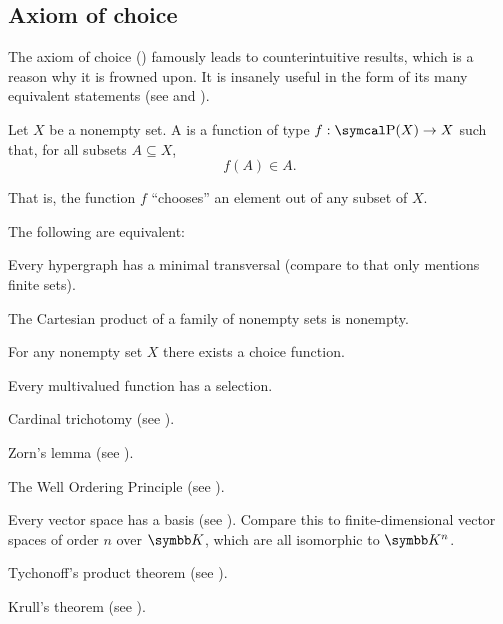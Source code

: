 \subsection{Axiom of choice}\label{subsec:axiom_of_choice}

\begin{remark}\label{remark:aoc}
  The axiom of choice () famously leads to counterintuitive results, which is a reason why it is frowned upon. It is insanely useful in the form of its many equivalent statements (see  and ).
\end{remark}

\begin{definition}\label{def:choice_function}
  Let \( X \) be a nonempty set. A  is a function of type \( f: \Power(X) \to X \) such that, for all subsets \( A \subseteq X \),
  \begin{equation*}
    f(A) \in A.
  \end{equation*}

  That is, the function \( f \) \enquote{chooses} an element out of any subset of \( X \).
\end{definition}

\begin{theorem}\label{thm:aoc}
  The following are equivalent:

  \begin{thmenum}
    \cite[theorem 6M(4)]{Enderton1977} Every hypergraph has a minimal transversal (compare to  that only mentions finite sets).

    \cite[theorem 6M(2)]{Enderton1977} The Cartesian product of a family of nonempty sets is nonempty.

    \cite[theorem 6M(3)]{Enderton1977} For any nonempty set \( X \) there exists a choice function.

    \cite[theorem 6M(1)]{Enderton1977} Every multivalued function has a selection.

     Cardinal trichotomy (see ).

     Zorn's lemma (see ).

     The Well Ordering Principle (see ).

     Every vector space has a basis (see ). Compare this to finite-dimensional vector spaces of order \( n \) over \( \BK \), which are all isomorphic to \( \BK^n \).

     Tychonoff's product theorem (see ).

     Krull's theorem (see ).
  \end{thmenum}
\end{theorem}
